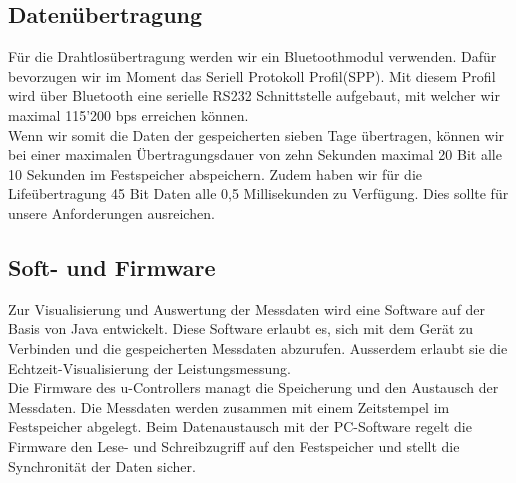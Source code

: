 \documentclass[12pt,a4paper]{article}
\begin{document}
\subsection{Datenübertragung}
Für die Drahtlosübertragung werden wir ein Bluetoothmodul verwenden. Dafür bevorzugen wir im Moment das \glqq Seriell Protokoll Profil\grqq(SPP). Mit diesem Profil wird über Bluetooth eine serielle RS232 Schnittstelle aufgebaut, mit welcher wir maximal 115'200 bps erreichen können.\\ 
Wenn wir somit die Daten der gespeicherten sieben Tage übertragen, können wir bei einer maximalen Übertragungsdauer von zehn Sekunden maximal 20 Bit alle 10 Sekunden im Festspeicher abspeichern. Zudem haben wir für die Lifeübertragung 45 Bit Daten alle 0,5 Millisekunden zu Verfügung. Dies sollte für unsere Anforderungen ausreichen.




\subsection{Soft- und Firmware}
Zur Visualisierung und Auswertung der Messdaten wird eine Software auf der Basis von Java entwickelt. Diese Software erlaubt es, sich mit dem Gerät zu Verbinden und die gespeicherten Messdaten abzurufen. Ausserdem erlaubt sie die Echtzeit-Visualisierung der Leistungsmessung. 
\\
Die Firmware des u-Controllers managt die Speicherung und den Austausch der Messdaten. Die Messdaten werden zusammen mit einem Zeitstempel im Festspeicher abgelegt. Beim Datenaustausch mit der PC-Software regelt die Firmware den Lese- und Schreibzugriff auf den Festspeicher und stellt die Synchronität der Daten sicher. 
\end{document}
